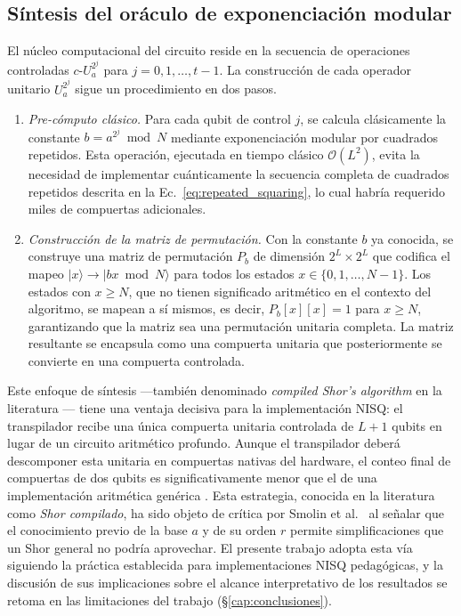 \documentclass[12pt, spanish]{book}
\begin{document}
\subsection{Síntesis del oráculo de exponenciación modular}

El núcleo computacional del circuito reside en la secuencia de operaciones controladas $c$-$U_{a}^{2^j}$ para $j = 0, 1, \ldots, t-1$. La construcción de cada operador unitario $U_{a}^{2^j}$ sigue un procedimiento en dos pasos.\\

\begin{enumerate}
    \item \textit{Pre-cómputo clásico.} Para cada qubit de control $j$, se calcula clásicamente la constante $b = a^{2^j} \bmod N$ mediante exponenciación modular por cuadrados repetidos. Esta operación, ejecutada en tiempo clásico $\mathcal{O}(L^2)$, evita la necesidad de implementar cuánticamente la secuencia completa de cuadrados repetidos descrita en la Ec.~\ref{eq:repeated_squaring}, lo cual habría requerido miles de compuertas adicionales.\\
    \item \textit{Construcción de la matriz de permutación.} Con la constante $b$ ya conocida, se construye una matriz de permutación $P_b$ de dimensión $2^L \times 2^L$ que codifica el mapeo $|x\rangle \to |bx \bmod N\rangle$ para todos los estados $x \in \{0, 1, \ldots, N-1\}$. Los estados con $x \geq N$, que no tienen significado aritmético en el contexto del algoritmo, se mapean a sí mismos, es decir, $P_b[x][x] = 1$ para $x \geq N$, garantizando que la matriz sea una permutación unitaria completa. La matriz resultante se encapsula como una compuerta unitaria que posteriormente se convierte en una compuerta controlada.\\ 
\end{enumerate}

Este enfoque de síntesis ---también denominado \textit{compiled Shor's algorithm} en la literatura \cite{Skosana2021,Lanyon2007}--- tiene una ventaja decisiva para la implementación NISQ: el transpilador recibe una única compuerta unitaria controlada de $L+1$ qubits en lugar de un circuito aritmético profundo. Aunque el transpilador deberá descomponer esta unitaria en compuertas nativas del hardware, el conteo final de compuertas de dos qubits es significativamente menor que el de una implementación aritmética genérica \cite{smolin2013oversimplifying}. Esta estrategia, conocida en la literatura como \textit{Shor compilado}, ha sido objeto de crítica por Smolin et al.~\cite{smolin2013oversimplifying} al señalar que el conocimiento previo de la base $a$ y de su orden $r$ permite simplificaciones que un Shor general no podría aprovechar. El presente trabajo adopta esta vía siguiendo la práctica establecida para implementaciones NISQ pedagógicas, y la discusión de sus implicaciones sobre el alcance interpretativo de los resultados se retoma en las limitaciones del trabajo (§\ref{cap:conclusiones}).
\end{document}
